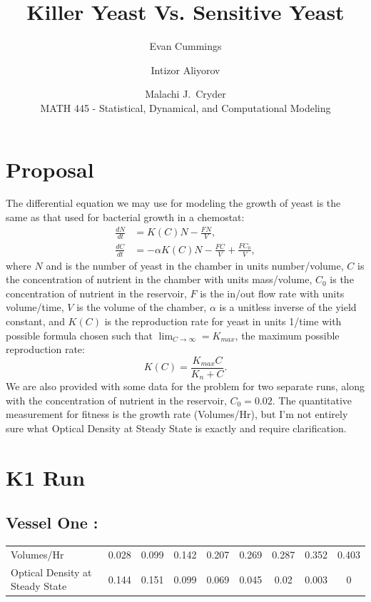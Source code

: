 


\small

\title{Killer Yeast Vs. Sensitive Yeast}
\author{Evan Cummings \and Intizor Aliyorov \and Malachi J.\ Cryder\\
MATH 445 - Statistical, Dynamical, and Computational Modeling}

\maketitle

\section*{Proposal}
The differential equation we may use for modeling the growth of yeast is the same as that used for bacterial growth in a chemostat:
\begin{align*}
  \frac{dN}{dt} &= K(C) N - \frac{FN}{V}, \\
  \frac{dC}{dt} &= -\alpha K(C) N - \frac{FC}{V} + \frac{FC_0}{V},
\end{align*}
where $N$ and is the number of yeast in the chamber in units number/volume, $C$ is the concentration of nutrient in the chamber with units mass/volume, $C_0$ is the concentration of nutrient in the reservoir, $F$ is the in/out flow rate with units volume/time, $V$ is the volume of the chamber, $\alpha$ is a unitless inverse of the yield constant, and $K(C)$ is the reproduction rate for yeast in units 1/time with possible formula chosen such that $\lim_{C \rightarrow \infty} = K_{max}$, the maximum possible reproduction rate:
$$K(C) = \frac{K_{max} C}{K_n + C}.$$
We are also provided with some data for the problem for two separate runs, along with the concentration of nutrient in the reservoir, $C_0 = 0.02$.  The quantitative measurement for fitness is the growth rate (Volumes/Hr), but I'm not entirely sure what Optical Density at Steady State is exactly and require clarification.

\section{K1 Run}
\subsection*{Vessel One :}
\begin{center}
\begin{tabular}{l|cccccccc}
  Volumes/Hr & 0.028 & 0.099 & 0.142 & 0.207 & 0.269 & 0.287 & 0.352 & 0.403 \\
  Optical Density at Steady State & 0.144 & 0.151 & 0.099 & 0.069 & 0.045 & 0.02 & 0.003 & 0 \\
\end{tabular}
\end{center}

